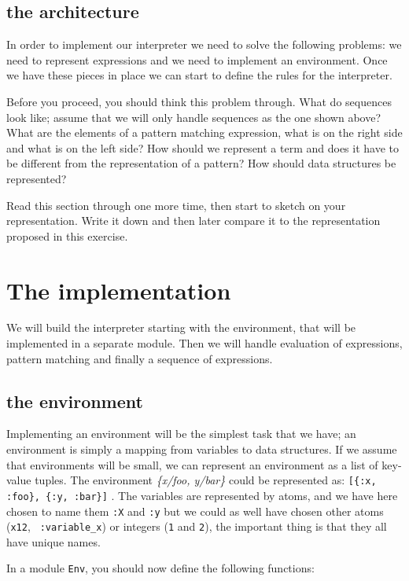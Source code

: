\documentclass[a4paper,11pt]{article}
\begin{document}
\subsection{the architecture}

In order to implement our interpreter we need to solve the following
problems: we need to represent expressions and we need to implement an
environment. Once we have these pieces in place we can start to define
the rules for the interpreter.

Before you proceed, you should think this problem through. What do
sequences look like; assume that we will only handle sequences as the
one shown above? What are the elements of a pattern
matching expression, what is on the right side and what is on the left
side? How should we represent a term and does it have to be different
from the representation of a pattern? How should data structures be
represented?

Read this section through one more time, then start to sketch on your
representation. Write it down and then later compare it to the
representation proposed in this exercise. 

\section{The implementation}

We will build the interpreter starting with the environment, that will
be implemented in a separate module. Then we will handle evaluation
of expressions, pattern matching and finally a sequence of
expressions.

\subsection{the environment}

Implementing an environment will be the simplest task that we have; an
environment is simply a mapping from variables to data structures. If
we assume that environments will be small, we can represent an
environment as a list of key-value tuples. The environment {\em
  \{x/foo, y/bar\}} could be represented as:
\verb+[{:x, :foo}, {:y, :bar}]+ . The variables are represented by
atoms, and we have here chosen to name them {\tt :X} and {\tt :y} but
we could as well have chosen other atoms ({\tt x12}, {\tt
  :variable\_x}) or integers ({\tt 1} and {\tt 2}), the important
thing is that they all have unique names.

In a module {\tt Env}, you should now define the following functions:
\end{document}
